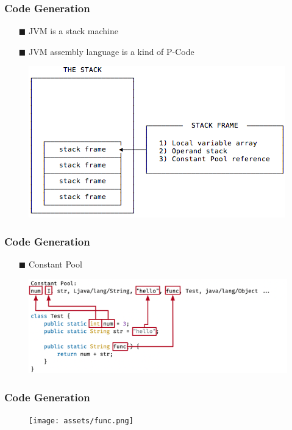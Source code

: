 \documentclass{beamer}
\begin{document}
\begin{frame}
    \frametitle{Code Generation}
    \begin{itemize}
        \item[$\blacksquare$] JVM is a stack machine
        \item[$\blacksquare$] JVM assembly language is a kind of P-Code
    \end{itemize}
    \begin{figure}[h]
        \centering
        \includegraphics[scale=0.5]{assets/JVM-stack.png}
    \end{figure}
\end{frame}

\begin{frame}
    \frametitle{Code Generation}
    \begin{itemize}
        \item[$\blacksquare$] Constant Pool
    \end{itemize}
    \begin{figure}[h]
        \centering
        \includegraphics[scale=0.5]{assets/constantpool.png}
    \end{figure}
\end{frame}

\begin{frame}
    \frametitle{Code Generation}
    \begin{figure}[h]
        \centering
        \texttt{[image: assets/func.png]}
    \end{figure}
\end{frame}
\end{document}
